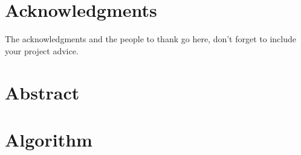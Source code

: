 \documentclass[a4paper,11pt,twoside,openright]{WCarticle}
\begin{document}

\tpage
\pagestyle{plain}

\chapter*{Acknowledgments}
The acknowledgments and the people to thank go here, don't forget to include your project advice. 


\chapter*{Abstract} 


\iffalse
\tableofcontents
\listoffigures
\listoftables
\fi
\cleardoublepage
\pagestyle{fancy}

\iffalse
\chapter{Introduction} \label{chap:intro}\pagenumbering{arabic}



\chapter{Related Work} \label{chap:backgrd}




\chapter{Preliminary} \label{chap:prelim}\pagenumbering{arabic}

\fi
\chapter{Algorithm} \label{chap:alg}


\iffalse
\chapter{Implementation} \label{chap:impl}




\chapter{Evaluation} \label{chap:eval}



\chapter{Conclusion} \label{chap:conclusion}

\fi

\end{document}
